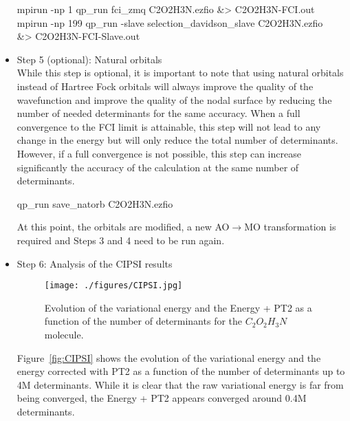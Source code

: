 \begin{itemize}
\begin{shade}
mpirun -np 1 qp_run fci_zmq C2O2H3N.ezfio &> C2O2H3N-FCI.out 
mpirun -np 199 qp_run -slave selection_davidson_slave C2O2H3N.ezfio\\
&> C2O2H3N-FCI-Slave.out 
\end{shade}

\item Step 5 (optional): Natural orbitals \\
While this step is optional, it is important to note that using natural orbitals instead of Hartree Fock orbitals will always improve the quality of the wavefunction and improve the quality of the nodal surface by reducing the number of needed determinants for the same accuracy. When a full convergence to the FCI limit is attainable, this step will not lead to any change in the energy but will only reduce the total number of determinants. However, if a full convergence is not possible, this step can increase significantly the accuracy of the calculation at the same number of determinants. \\

\begin{shade}
qp_run save_natorb C2O2H3N.ezfio  
\end{shade}
\hfill

At this point, the orbitals are modified, a new AO$\rightarrow$MO transformation is required and Steps 3 and 4 need to be run again.\\

\item Step 6: Analysis of the CIPSI results\\
\begin{figure}
\begin{center}
\texttt{[image: ./figures/CIPSI.jpg]}
\end{center}
\caption{Evolution of the variational energy and the Energy + PT2 as a function of the number of determinants for the $C_2O_2H_3N$ molecule.}
\protect{\label{fig:CIPSI}}
\end{figure}
Figure~\ref{fig:CIPSI} shows the evolution of the variational energy and the energy corrected with PT2 as a function of the number of determinants up to 4M determinants. While it is clear that the raw variational energy is far from being converged, the Energy + PT2 appears converged around 0.4M determinants.\\




\end{itemize}

